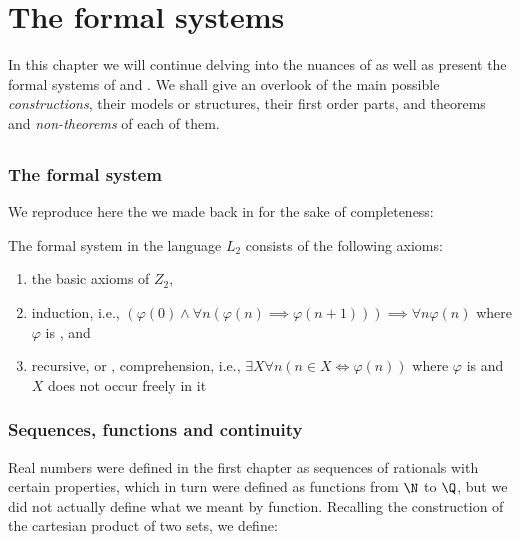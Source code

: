 \documentclass[../main.tex]{memoir}
\begin{document}
\chapter{The formal systems}

In this chapter we will continue delving into the nuances of \rca as well as present the formal systems of \wkl and \aca. We shall give an overlook of the main possible \textit{constructions}, their models or structures, their first order parts, and theorems and \textit{non-theorems} of each of them.

\section{\rca}

\subsection{The formal system}

We reproduce here the  we made back in  for the sake of completeness:

\begin{definition}
  The formal system \rca in the language $L_2$ consists of the following axioms:

  \begin{enumerate}
  \item the basic axioms of $Z_2$,
  \item \re  induction, i.e., $(\varphi(0) \land \forall n (\varphi(n) \implies \varphi(n + 1))) \implies \forall n \varphi(n)$ where $\varphi$ is \re, and
  \item recursive, or \rec, comprehension, i.e., $\exists X \forall n (n \in X \iff \varphi(n))$ where $\varphi$ is \rec and $X$ does not occur freely in it
  \end{enumerate}
\end{definition}

\subsection{Sequences, functions and continuity}

Real numbers were defined in the first chapter as sequences of rationals with certain properties, which in turn were defined as functions from $\N$ to $\Q$, but we did not actually define what we meant by function. Recalling the construction of the cartesian product of two sets, we define:
\end{document}
